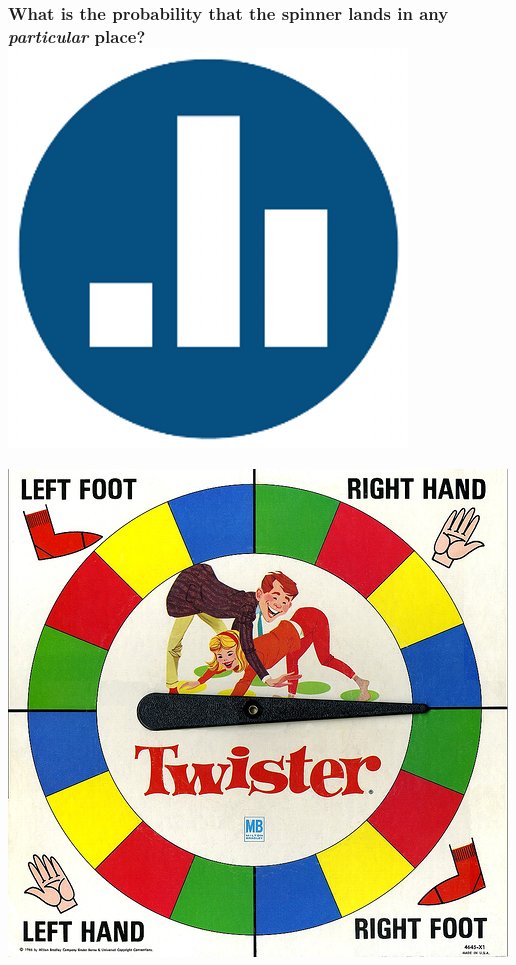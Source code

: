 \documentclass[handout]{beamer}
\begin{document}
%
%
\begin{frame}
\frametitle{What is the probability that the spinner lands in any \emph{particular} place?\hfill \includegraphics[scale = 0.05]{./images/clicker}}

\begin{center}
	\includegraphics[scale = 0.6]{./images/twister}
\end{center}
\end{frame}
\end{document}
